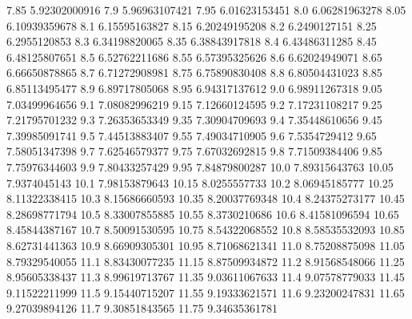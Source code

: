            7.85    5.92302000916
            7.9    5.96963107421
           7.95    6.01623153451
            8.0    6.06281963278
           8.05    6.10939359678
            8.1    6.15595163827
           8.15    6.20249195208
            8.2     6.2490127151
           8.25     6.2955120853
            8.3    6.34198820065
           8.35    6.38843917818
            8.4    6.43486311285
           8.45    6.48125807651
            8.5    6.52762211686
           8.55    6.57395325626
            8.6    6.62024949071
           8.65    6.66650878865
            8.7    6.71272908981
           8.75    6.75890830408
            8.8    6.80504431023
           8.85    6.85113495477
            8.9    6.89717805068
           8.95    6.94317137612
            9.0    6.98911267318
           9.05    7.03499964656
            9.1    7.08082996219
           9.15    7.12660124595
            9.2    7.17231108217
           9.25    7.21795701232
            9.3    7.26353653349
           9.35    7.30904709693
            9.4    7.35448610656
           9.45    7.39985091741
            9.5    7.44513883407
           9.55    7.49034710905
            9.6     7.5354729412
           9.65    7.58051347398
            9.7    7.62546579377
           9.75    7.67032692815
            9.8    7.71509384406
           9.85    7.75976344603
            9.9    7.80433257429
           9.95    7.84879800287
           10.0    7.89315643763
          10.05     7.9374045143
           10.1    7.98153879643
          10.15     8.0255557733
           10.2    8.06945185777
          10.25    8.11322338415
           10.3    8.15686660593
          10.35    8.20037769348
           10.4    8.24375273177
          10.45    8.28698771794
           10.5    8.33007855885
          10.55     8.3730210686
           10.6    8.41581096594
          10.65    8.45844387167
           10.7    8.50091530595
          10.75    8.54322068552
           10.8    8.58535532093
          10.85    8.62731441363
           10.9    8.66909305301
          10.95    8.71068621341
           11.0    8.75208875098
          11.05    8.79329540055
           11.1    8.83430077235
          11.15    8.87509934872
           11.2    8.91568548066
          11.25    8.95605338437
           11.3    8.99619713767
          11.35    9.03611067633
           11.4    9.07578779033
          11.45    9.11522211999
           11.5    9.15440715207
          11.55    9.19333621571
           11.6    9.23200247831
          11.65    9.27039894126
           11.7    9.30851843565
          11.75    9.34635361781
